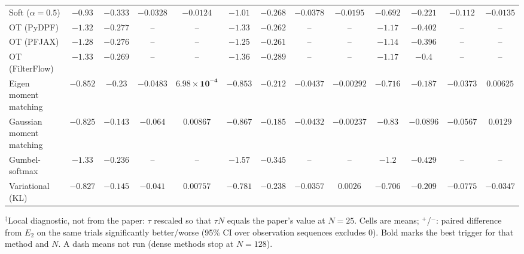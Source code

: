 \begin{table}[ht]
\begin{adjustbox}{max width=\linewidth}
\begin{tabular}{lcccc|cccc|cccc}
Soft ($\alpha{=}0.5$) & $-0.93$ & $-0.333$ & $\mathbf{-0.0328}$ & $\mathbf{-0.0124}$ & $-1.01$ & $-0.268$ & $-0.0378$ & $-0.0195$ & $\mathbf{-0.692}$ & $\mathbf{-0.221}$ & $-0.112$ & $-0.0135$ \\
OT (PyDPF) & $-1.32$ & $-0.277$ & -- & -- & $-1.33$ & $\mathbf{-0.262}$ & -- & -- & $\mathbf{-1.17}$ & $-0.402$ & -- & -- \\
OT (PFJAX) & $-1.28$ & $-0.276$ & -- & -- & $-1.25$ & $\mathbf{-0.261}$ & -- & -- & $\mathbf{-1.14}$ & $-0.396$ & -- & -- \\
OT (FilterFlow) & $-1.33$ & $\mathbf{-0.269}$ & -- & -- & $-1.36$ & $-0.289$ & -- & -- & $\mathbf{-1.17}$ & $-0.4$ & -- & -- \\
Eigen moment matching & $-0.852$ & $-0.23$ & $-0.0483$ & $\mathbf{6.98\times10^{-4}}$ & $-0.853$ & $-0.212$ & $-0.0437$ & $-0.00292$ & $\mathbf{-0.716}$ & $\mathbf{-0.187}$ & $\mathbf{-0.0373}$ & $0.00625$ \\
Gaussian moment matching & $\mathbf{-0.825}$ & $-0.143$ & $-0.064$ & $0.00867$ & $-0.867$ & $-0.185$ & $\mathbf{-0.0432}$ & $\mathbf{-0.00237}$ & $-0.83$ & $\mathbf{-0.0896}$ & $-0.0567$ & $0.0129$ \\
Gumbel-softmax & $-1.33$ & $\mathbf{-0.236}$ & -- & -- & $-1.57$ & $-0.345$ & -- & -- & $\mathbf{-1.2}$ & $-0.429$ & -- & -- \\
Variational (KL) & $-0.827$ & $\mathbf{-0.145}$ & $-0.041$ & $0.00757$ & $-0.781$ & $-0.238$ & $\mathbf{-0.0357}$ & $\mathbf{0.0026}$ & $\mathbf{-0.706}$ & $-0.209$ & $-0.0775$ & $-0.0347$ \\
\bottomrule
\end{tabular}
\end{adjustbox}
\par\smallskip\parbox{0.95\linewidth}{\footnotesize $^\dagger$Local diagnostic, not from the paper: $\tau$ rescaled so that $\tau N$ equals the paper's value at $N{=}25$. Cells are means; $^{+}$/$^{-}$: paired difference from $E_2$ on the same trials significantly better/worse (95\% CI over observation sequences excludes 0). Bold marks the best trigger for that method and $N$. A dash means not run (dense methods stop at $N{=}128$).}
\end{table}

